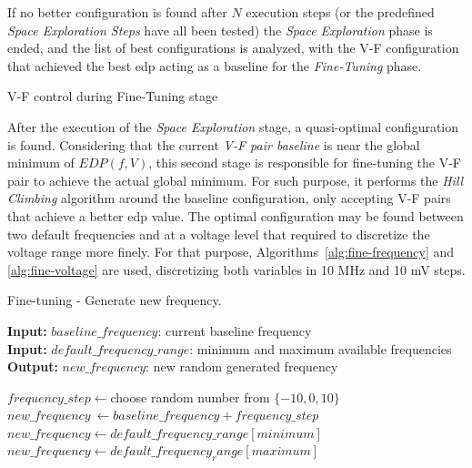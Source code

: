If no better configuration is found after $ N $ execution steps (or the predefined \textit{Space Exploration Steps} have all been tested) the \textit{Space Exploration} phase is ended, and the list of best configurations is analyzed, with the V-F configuration that achieved the best \acrshort{edp} acting as a baseline for the \textit{Fine-Tuning} phase.


\bigskip
V-F control during Fine-Tuning stage
\bigskip

After the execution of the \textit{Space Exploration} stage, a quasi-optimal configuration is found. Considering that the current \textit{V-F pair baseline} is near the global minimum of $EDP(f, V)$, this second stage is responsible for fine-tuning the V-F pair to achieve the actual global minimum. For such purpose, it performs the \textit{Hill Climbing} algorithm around the baseline configuration, only accepting V-F pairs that achieve a better \acrshort{edp} value. The optimal configuration may be found  between two default frequencies and at a voltage level that required to discretize the voltage range more finely. For that purpose, Algorithms~\ref{alg:fine-frequency} and \ref{alg:fine-voltage} are used, discretizing both variables in 10 MHz and 10 mV steps.

\begin{algorithm}[h]
    \caption{Fine-tuning - Generate new frequency.}
    \label{alg:fine-frequency}
 \hspace*{\algorithmicindent} \textbf{Input:} $baseline\_frequency$: current baseline frequency \\
 \hspace*{\algorithmicindent} \textbf{Input:} $default\_frequency\_range$: minimum and maximum available frequencies \\
 \hspace*{\algorithmicindent} \textbf{Output:} $new\_frequency$: new random generated frequency
\begin{algorithmic}
\STATE $frequency\_step \leftarrow $choose random number from $\{-10, 0, 10\}$
\STATE $new\_frequency\ \leftarrow baseline\_frequency + frequency\_step$
\STATE $new\_frequency \leftarrow default\_frequency\_range[minimum]$
\STATE $new\_frequency \leftarrow default\_frequency_range[maximum]$
\ENDIF
\end{algorithmic}
\end{algorithm}

